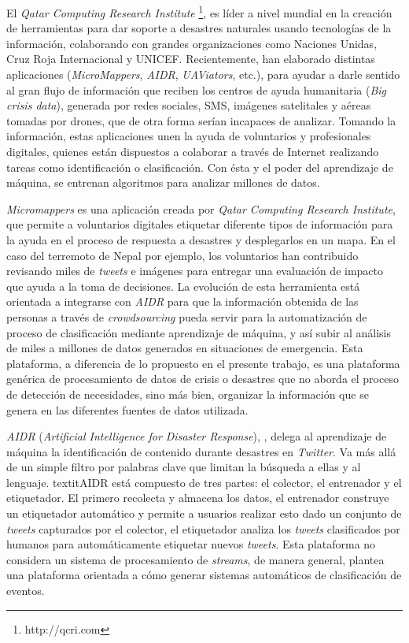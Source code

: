 El \textit{Qatar Computing Research Institute} \footnote{http://qcri.com}, es líder a nivel mundial en la creación de herramientas para dar soporte a desastres naturales usando tecnologías de la información, colaborando con grandes organizaciones como Naciones Unidas, Cruz Roja Internacional y UNICEF. Recientemente, han elaborado distintas aplicaciones (\textit{MicroMappers}, \textit{AIDR}, \textit{UAViators}, etc.), para ayudar a darle sentido al gran flujo de información que reciben los centros de ayuda humanitaria (\textit{Big crisis data}), generada por redes sociales, SMS, imágenes satelitales y aéreas tomadas por drones, que de otra forma serían incapaces de analizar.
Tomando la información, estas aplicaciones unen la ayuda de voluntarios y profesionales digitales, quienes están dispuestos a colaborar a través de Internet realizando tareas como identificación o clasificación. Con ésta y el poder del aprendizaje de máquina, se entrenan algoritmos para analizar millones de datos.

\textit{Micromappers} \citep{MicroMappers} es una aplicación creada por \textit{Qatar Computing Research Institute}, que permite a voluntarios digitales etiquetar diferente tipos de información para la ayuda en el proceso de respuesta a desastres y desplegarlos en un mapa. En el caso del terremoto de Nepal por ejemplo, los voluntarios han contribuido revisando miles de \textit{tweets} e imágenes para entregar una evaluación de impacto que ayuda a la toma de decisiones. La evolución de esta herramienta está orientada a integrarse con \textit{AIDR} para que la información obtenida de las personas a través de \textit{crowdsourcing} pueda servir para la automatización de proceso de clasificación mediante aprendizaje de máquina, y así subir al análisis de miles a millones de datos generados en situaciones de emergencia. Esta plataforma, a diferencia de lo propuesto en el presente trabajo, es una plataforma genérica de procesamiento de datos de crisis o desastres que no aborda el proceso de detección de necesidades, sino más bien, organizar la información que se genera en las diferentes fuentes de datos utilizada.

\textit{AIDR} (\textit{Artificial Intelligence for Disaster Response}), \citep{AIDR}, delega al aprendizaje de máquina la identificación de contenido durante desastres en \textit{Twitter}. Va más allá de un simple filtro por palabras clave que limitan la búsqueda a ellas y al lenguaje. textit{AIDR} está compuesto de tres partes: el colector, el entrenador y el etiquetador. El primero recolecta y almacena los datos, el entrenador construye un etiquetador automático y permite a usuarios realizar esto dado un conjunto de \textit{tweets} capturados por el colector, el etiquetador analiza los \textit{tweets} clasificados por humanos para automáticamente etiquetar nuevos \textit{tweets}. Esta plataforma no considera un sistema de procesamiento de \textit{streams}, de manera general, plantea una plataforma orientada a cómo generar sistemas automáticos de clasificación de eventos.

